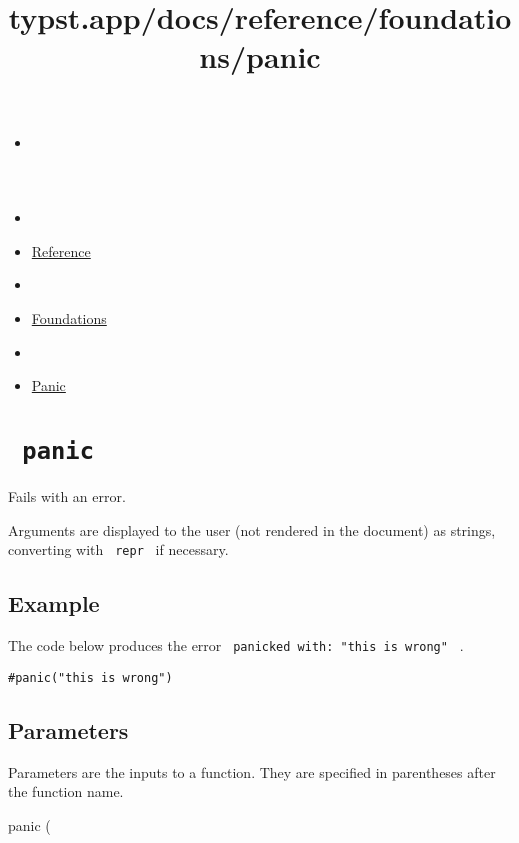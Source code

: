 \title{typst.app/docs/reference/foundations/panic}

\begin{itemize}
\tightlist
\item
  \href{/docs}{}
\item
  
\item
  \href{/docs/reference/}{Reference}
\item
  
\item
  \href{/docs/reference/foundations/}{Foundations}
\item
  
\item
  \href{/docs/reference/foundations/panic/}{Panic}
\end{itemize}

\section{\texorpdfstring{\texttt{\ panic\ }}{ panic }}\label{summary}

Fails with an error.

Arguments are displayed to the user (not rendered in the document) as
strings, converting with \texttt{\ repr\ } if necessary.

\subsection{Example}\label{example}

The code below produces the error
\texttt{\ panicked\ with:\ "this\ is\ wrong"\ } .

\begin{verbatim}
#panic("this is wrong")
\end{verbatim}

\subsection{\texorpdfstring{{ Parameters
}}{ Parameters }}\label{parameters}

\label{parameters-tooltip}
Parameters are the inputs to a function. They are specified in
parentheses after the function name.

{ panic } (

